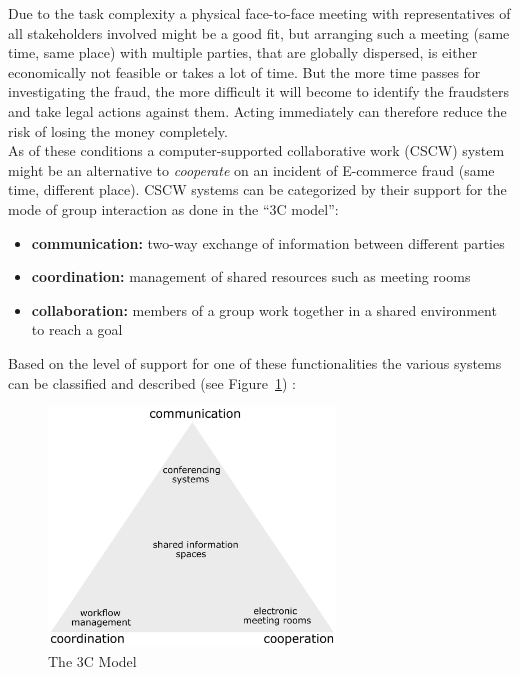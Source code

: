 Due to the task complexity a physical face-to-face meeting with representatives of all stakeholders involved might be a good fit, but arranging such a meeting (same time, same place) with multiple parties, that are globally dispersed, is either economically not feasible or takes a lot of time. But the more time passes for investigating the fraud, the more difficult it will become to identify the fraudsters and take legal actions against them. Acting immediately can therefore reduce the risk of losing the money completely. \\

As of these conditions a computer-supported collaborative work (\gls{CSCW}) system might be an alternative to \textit{cooperate} on an incident of \gls{E-commerce} fraud (same time, different place). \gls{CSCW} systems can be categorized by their support for the mode of group interaction as done in the ``3C model'': \@

\begin{itemize}
    \item\textbf{communication:} two-way exchange of information between different parties
    \item\textbf{coordination:} management of shared resources such as meeting rooms
    \item\textbf{collaboration:} members of a group work together in a shared environment to reach a goal
\end{itemize}

Based on the level of support for one of these functionalities the various systems can be classified and described (see Figure~\ref{fig:images_3C_model}) \citep{Koch2008}: \@

\begin{figure}[H]
	\centering
		\includegraphics[height=2.5in]{images/3C-model.pdf}
	\caption[The 3C Model]{The 3C Model \citep{Koch2008}}
\label{fig:images_3C_model}
\end{figure}

